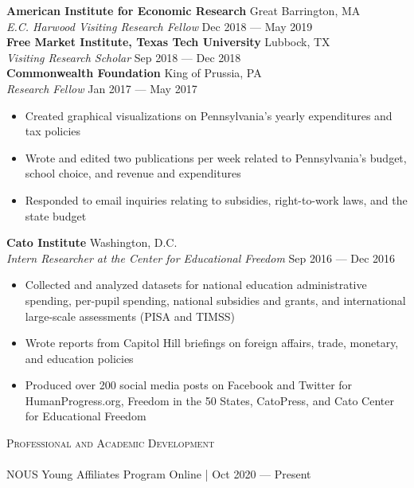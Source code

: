 \documentclass[a4paper,11pt]{article}
\newcommand{\lineunder} {
    \vspace*{-8pt} \\
    \hspace*{-18pt} \hrulefill \\
}
\newcommand{\header} [1] {
    {\hspace*{-18pt}\vspace*{6pt} \textsc{\large{#1}}}
    \vspace*{-6pt} \lineunder
}
\begin{document}
\textbf{American Institute for Economic Research} \hfill Great Barrington, MA\\
\textit{E.C. Harwood Visiting Research Fellow} \hfill Dec 2018 --- May 2019\\

\textbf{Free Market Institute, Texas Tech University} \hfill Lubbock, TX\\
\textit{Visiting Research Scholar} \hfill Sep 2018 --- Dec 2018\\

\textbf{Commonwealth Foundation} \hfill King of Prussia, PA\\
\textit{Research Fellow} \hfill Jan 2017 --- May 2017\\
\begin{itemize}[noitemsep,nolistsep]
    \item Created graphical visualizations on Pennsylvania’s yearly expenditures and tax policies
    \item Wrote and edited two publications per week related to Pennsylvania's budget, school choice, and revenue and expenditures
    \item Responded to email inquiries relating to subsidies, right-to-work laws, and the state budget
\end{itemize}

\textbf{Cato Institute} \hfill Washington, D.C.\\
\textit{Intern Researcher at the Center for Educational Freedom} \hfill Sep 2016 --- Dec 2016\\
\begin{itemize}[noitemsep,nolistsep]
    \item Collected and analyzed datasets for national education administrative spending, per-pupil spending, national subsidies and grants, and international large-scale assessments (PISA and TIMSS)
    \item Wrote reports from Capitol Hill briefings on foreign affairs, trade, monetary, and education policies
    \item Produced over 200 social media posts on Facebook and Twitter for HumanProgress.org, Freedom in the 50 States, CatoPress, and Cato Center for Educational Freedom
\end{itemize}
\vspace{1mm}
\header{Professional and Academic Development}

NOUS Young Affiliates Program \hfill Online | Oct 2020 --- Present \\
\end{document}
